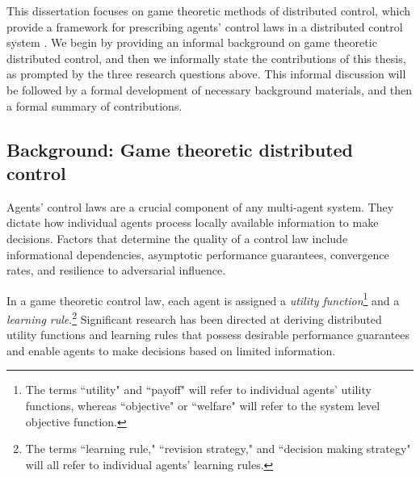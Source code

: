 This dissertation focuses on game theoretic methods of distributed control, which provide a framework for prescribing agents' control laws in a distributed control system \cite{Marden2008, Zhu2009, Goto2010, Staudigl2012, Fox2010, Lasaulce2011, Alpcan2010, Han2012, MacKenzie2006, Menache2011}. We begin by providing an informal background on game theoretic distributed control, and then we informally state the contributions of this thesis, as prompted by the three research questions above. This informal discussion will be followed by a formal development of necessary background materials, and then a formal summary of  contributions. 

\subsection{Background: Game theoretic distributed control}

Agents' control laws are a crucial component of any multi-agent system. They dictate how individual agents process locally available information to make decisions. Factors that determine the quality of a control law include informational dependencies, asymptotic performance guarantees, convergence rates, and resilience to adversarial influence.

In a game theoretic control law, each agent is assigned a {\it utility function}\footnote{The terms ``utility" and ``payoff" will refer to individual agents' utility functions, whereas ``objective" or ``welfare" will refer to the system level objective function.} and a {\it learning rule}.\footnote{The terms ``learning rule," ``revision strategy," and ``decision making strategy" will all refer to individual agents' learning rules.} Significant research has been directed at deriving distributed utility functions and learning rules that possess desirable performance guarantees and enable agents to make decisions based on limited information.




